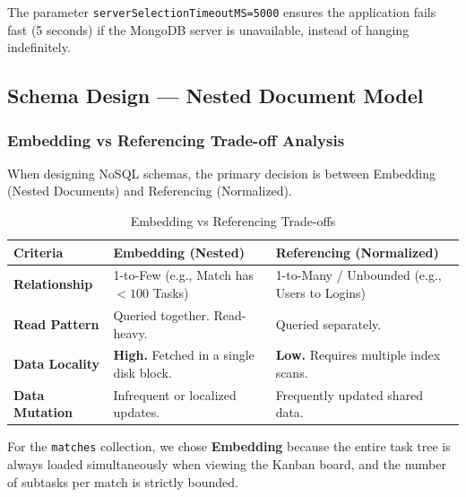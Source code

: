 \documentclass[a4paper,12pt]{article}
\begin{document}
The parameter \texttt{serverSelectionTimeoutMS=5000} ensures the application fails fast (5 seconds) if the MongoDB server is unavailable, instead of hanging indefinitely.

\subsection{Schema Design --- Nested Document Model}

\subsubsection{Embedding vs Referencing Trade-off Analysis}
When designing NoSQL schemas, the primary decision is between Embedding (Nested Documents) and Referencing (Normalized).

\begin{table}[H]
\centering
\begin{tabular}{|l|p{6cm}|p{6cm}|}
\hline
\textbf{Criteria} & \textbf{Embedding (Nested)} & \textbf{Referencing (Normalized)} \\ \hline
\textbf{Relationship} & 1-to-Few (e.g., Match has $<100$ Tasks) & 1-to-Many / Unbounded (e.g., Users to Logins) \\ \hline
\textbf{Read Pattern} & Queried together. Read-heavy. & Queried separately. \\ \hline
\textbf{Data Locality} & \textbf{High.} Fetched in a single disk block. & \textbf{Low.} Requires multiple index scans. \\ \hline
\textbf{Data Mutation} & Infrequent or localized updates. & Frequently updated shared data. \\ \hline
\end{tabular}
\caption{Embedding vs Referencing Trade-offs}
\end{table}

For the \texttt{matches} collection, we chose \textbf{Embedding} because the entire task tree is always loaded simultaneously when viewing the Kanban board, and the number of subtasks per match is strictly bounded.
\end{document}
